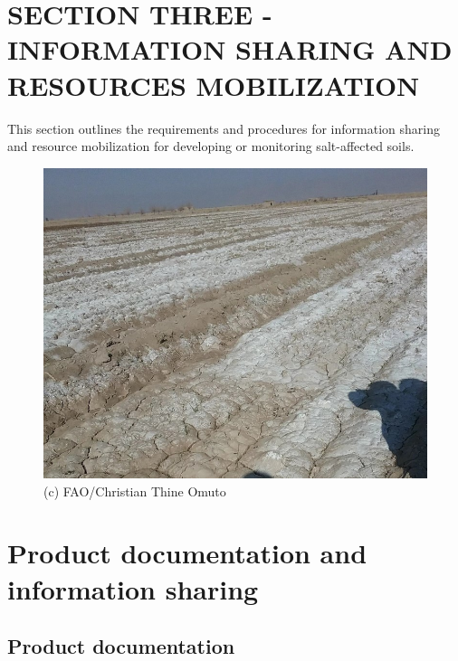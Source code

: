 \documentclass[
  10pt,
  b5paper,
]{book}
\begin{document}
\hypertarget{section-three---information-sharing-and-resources-mobilization}{%
\chapter*{SECTION THREE - INFORMATION SHARING AND RESOURCES MOBILIZATION}\label{section-three---information-sharing-and-resources-mobilization}}

This section outlines the requirements and procedures for information sharing and resource mobilization for developing or monitoring salt-affected soils.

\begin{figure}
\centering
\includegraphics{figures/images/Figure_sectionIII.jpg}
\caption{(c) FAO/Christian Thine Omuto}
\end{figure}

\hypertarget{product-documentation-and-information-sharing}{%
\chapter{Product documentation and information sharing}\label{product-documentation-and-information-sharing}}

\hypertarget{product-documentation}{%
\section{Product documentation}\label{product-documentation}}
\end{document}
